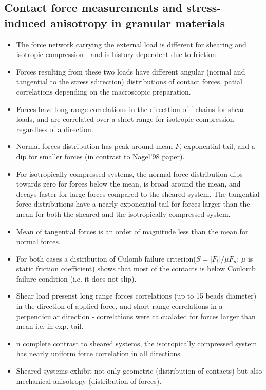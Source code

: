 \documentclass[10pt,a4paper]{article}
\begin{document}
\subsection{Contact force measurements and stress-induced anisotropy in granular materials\cite{bob:05}}
\begin{itemize}
 \item The force network carrying the external load is different for shearing and isotropic compression - and is history dependent due to friction.
 \item Forces resulting from these two loads have different angular (normal and tangential to the stress sdirection) distributions of contact forces,
 patial correlations depending on the macroscopic preparation.
 \item Forces have long-range correlations in the directtion of f-chains for shear loads, and are correlated over a short range for isotropic 
 compression regardless of a direction. 
 \item Normal forces distribution has peak around mean $\bar{F}$, exponential tail, and a dip for smaller forces (in contrast to Nagel'98 paper).
 \item For isotropically compressed systems, the normal force distribution dips towards zero for forces below the mean, 
 is broad around the mean, and decays  faster for large forces compared to the sheared system. 
 The tangential force distributions have a nearly exponential tail for forces larger than the mean 
 for both the sheared and the isotropically compressed system.
 \item Mean of tangential forces is an order of magnitude less than the mean for normal forces. 
 \item For both cases a distribution of Culomb failure criterion($S = |F_t|/\mu F_n$; $\mu$ is static friction coefficient)
 shows that most of the contacts is below Coulomb failure condition (i.e. it does not slip).
 \item Shear load presenst long range forces correlations  (up to 15 beads diameter) in the direction of applied force,
 and short range correlations in a perpendicular direction - correlations were calcualated for forces larger than mean i.e. in exp. tail.
 \item n complete contrast to sheared systems, the isotropically compressed system has nearly uniform force correlation in all directions.
 \item Sheared systems exhibit not only geometric (distribution of contacts) but also mechanical anisotropy (distribution of forces).
\end{itemize}


\thispagestyle{empty} %




\clearpage
\end{document}

